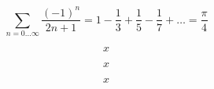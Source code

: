\usepackage{fullpage}



\begin{equation*}
\sum_{n=0...\infty} \frac{(-1)^n}{2n+1} = 1 - \frac{1}{3} + \frac{1}{5} - \frac{1}{7} + \dots = \frac{\pi}{4}
\end{equation*}


\begin{equation*}
x
\end{equation*}


\begin{equation*}
x
\end{equation*}


\begin{equation*}
x
\end{equation*}


